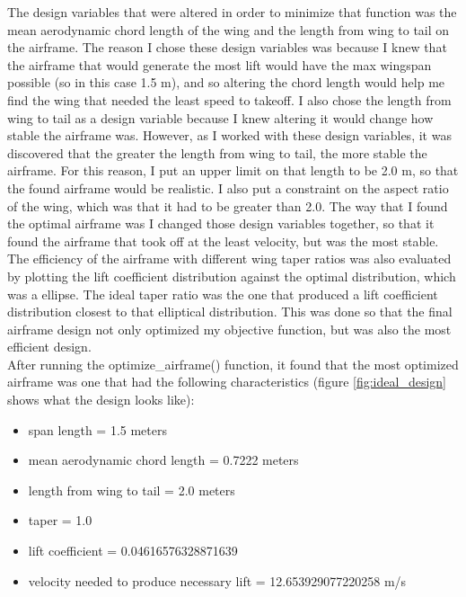 \documentclass{journal}
\begin{document}
	The design variables that were altered in order to minimize that function was the mean aerodynamic chord length of the wing and the length from wing to tail on the airframe. The reason I chose these design variables was because I knew that the airframe that would generate the most lift would have the max wingspan possible (so in this case 1.5 m), and so altering the chord length would help me find the wing that needed the least speed to takeoff. I also chose the length from wing to tail as a design variable because I knew altering it would change how stable the airframe was. However, as I worked with these design variables, it was discovered that the greater the length from wing to tail, the more stable the airframe. For this reason, I put an upper limit on that length to be 2.0 m, so that the found airframe would be realistic. I also put a constraint on the aspect ratio of the wing, which was that it had to be greater than 2.0. The way that I found the optimal airframe was I changed those design variables together, so that it found the airframe that took off at the least velocity, but was the most stable. The efficiency of the airframe with different wing taper ratios was also evaluated by plotting the lift coefficient distribution against the optimal distribution, which was a ellipse. The ideal taper ratio was the one that produced a lift coefficient distribution closest to that elliptical distribution. This was done so that the final airframe design not only optimized my objective function, but was also the most efficient design.\\
	
	After running the optimize\_airframe() function, it found that the most optimized airframe was one that had the following characteristics (figure \ref{fig:ideal_design} shows what the design looks like):
	
	\begin{itemize}
		\item span length = 1.5 meters
		\item mean aerodynamic chord length = 0.7222 meters
		\item length from wing to tail = 2.0 meters
		\item taper = 1.0
		\item lift coefficient = 0.04616576328871639
		\item velocity needed to produce necessary lift = 12.653929077220258 m/s
	\end{itemize}
	
\end{document}
